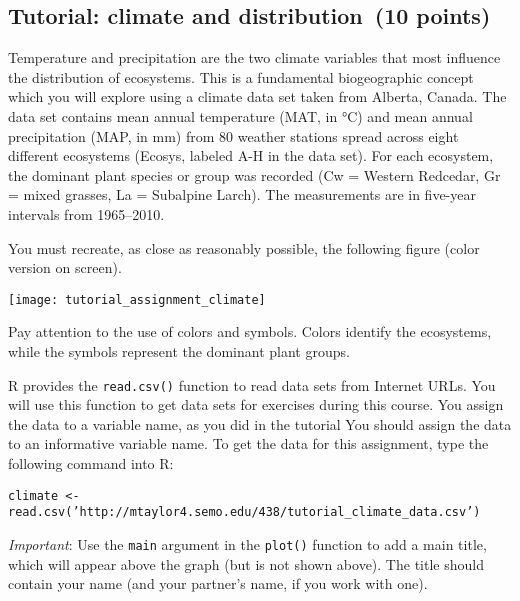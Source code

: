 \documentclass[11pt]{article}
\newcommand{\assignmentTitle}{Tutorial: climate and distribution}
\begin{document}
\thispagestyle{firstpage}

\subsection*{\assignmentTitle\ (10 points)}

Temperature and precipitation are the two climate variables that most
influence the distribution of ecosystems. This is a fundamental
biogeographic concept which you will explore using a climate data set
taken from Alberta, Canada. The data set contains mean annual
temperature (MAT, in °C) and mean annual precipitation (MAP, in mm) from
80 weather stations spread across eight different ecosystems (Ecosys,
labeled A-H in the data set). For each ecosystem, the dominant plant species or group
was recorded (Cw = Western Redcedar, Gr = mixed grasses, La = Subalpine
Larch). The measurements are in five-year intervals from 1965--2010.

You must recreate, as close as reasonably possible, the following figure
(color version on screen).

\begin{center}
	\texttt{[image: tutorial\_assignment\_climate]}
\end{center}

Pay attention to the use of colors and symbols. Colors identify the
ecosystems, while the symbols represent the dominant plant groups.

R provides the \texttt{read.csv()} function to read data sets from Internet 
URLs. You will use this function  to get data sets for exercises during this
course. You assign the data to a variable name, as you did in the tutorial
You should assign the data to an informative variable name. To get the 
data for this assignment, type the following command into R:


\texttt{climate \textless{}-
read.csv('http://mtaylor4.semo.edu/438/tutorial\_climate\_data.csv')}

\textit{Important}: Use the \texttt{main} argument in the \texttt{plot()} function to add
a main title, which will appear above the graph (but is not shown
above). The title should contain your name (and your partner's name, if you work with one).
\end{document}

